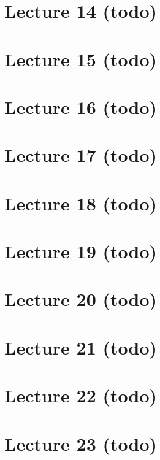 \hypertarget{lecture-14-todo}{%
\section{Lecture 14 (todo)}\label{lecture-14-todo}}

\hypertarget{lecture-15-todo}{%
\section{Lecture 15 (todo)}\label{lecture-15-todo}}

\hypertarget{lecture-16-todo}{%
\section{Lecture 16 (todo)}\label{lecture-16-todo}}

\hypertarget{lecture-17-todo}{%
\section{Lecture 17 (todo)}\label{lecture-17-todo}}

\hypertarget{lecture-18-todo}{%
\section{Lecture 18 (todo)}\label{lecture-18-todo}}

\hypertarget{lecture-19-todo}{%
\section{Lecture 19 (todo)}\label{lecture-19-todo}}

\hypertarget{lecture-20-todo}{%
\section{Lecture 20 (todo)}\label{lecture-20-todo}}

\hypertarget{lecture-21-todo}{%
\section{Lecture 21 (todo)}\label{lecture-21-todo}}

\hypertarget{lecture-22-todo}{%
\section{Lecture 22 (todo)}\label{lecture-22-todo}}

\hypertarget{lecture-23-todo}{%
\section{Lecture 23 (todo)}\label{lecture-23-todo}}

